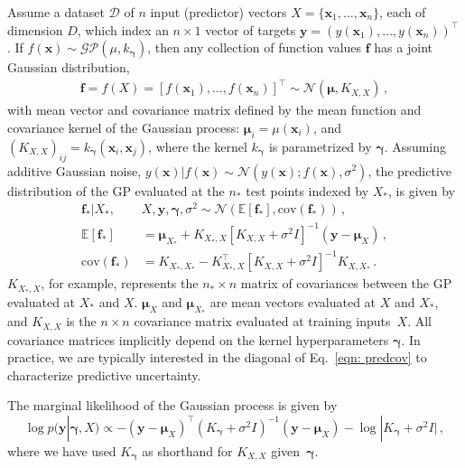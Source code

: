 \documentclass[11pt]{article}
\newcommand{\mbf}[1]{{\boldsymbol{\mathbf{#1}}}}
\renewcommand{\bm}{\mbf}
\begin{document}
Assume a dataset $\mathcal{D}$ of $n$ input (predictor) vectors
$X = \{\bm{x}_1,\dots,\bm{x}_n\}$, each of dimension $D$,
which index an $n \times 1$ vector of targets
$\bm{y} = (y(\bm{x}_1),\dots,y(\bm{x}_n))^{\top}$.  If
$f(\bm{x}) \sim \mathcal{GP}(\mu,k_{\bm{\gamma}})$, then any
collection of function values $\bm{f}$ has a joint Gaussian
distribution,
\begin{align}
 \bm{f} = f(X) = [f(\bm{x}_1),\dots,f(\bm{x}_n)]^{\top} \sim \mathcal{N}(\bm{\mu},K_{X,X}) \,,  \label{eqn: gpdef}
\end{align}
with mean vector and covariance matrix defined by the mean function and covariance kernel of
the Gaussian process: $\bm{\mu}_i = \mu(\bm{x}_i)$, and $(K_{X,X})_{ij} = k_\bm{\gamma}(\bm{x}_i,\bm{x}_j)$,
where the kernel $k_{\bm{\gamma}}$ is parametrized by $\bm{\gamma}$.  Assuming additive
Gaussian noise, $y(\bm{x})|f(\bm{x}) \sim \mathcal{N}(y(\bm{x}); f(\bm{x}),\sigma^2)$,
the predictive distribution of the GP evaluated at the
$n_*$ test points indexed by $X_*$, is given by
\begin{align}
 \bm{f}_*|X_*,&X,\bm{y},\bm{\gamma},\sigma^2 \sim \mathcal{N}(\mathbb{E}[\bm{f}_*],\text{cov}(\bm{f}_*)) \,, \label{eqn: fullpred}  \\
 \mathbb{E}[\bm{f}_*] &= \bm{\mu}_{X_*}  + K_{X_*,X}[K_{X,X}+\sigma^2 I]^{-1} (\bm{y} - \bm{\mu}_X)\,,    \\
 \text{cov}(\bm{f}_*) &= K_{X_*,X_*} - K_{X_*,X}^{\top}[K_{X,X}+\sigma^2 I]^{-1}K_{X,X_*} \,. \label{eqn: predcov}
\end{align}
$K_{X_*,X}$, for example, represents the $n_* \times n$ matrix of covariances between
the GP evaluated at $X_*$ and $X$.   $\bm{\mu}_{X}$  and $\bm{\mu}_{X_*}$ are mean
vectors evaluated at $X$ and $X_*$, and $K_{X,X}$ is the $n \times n$ covariance
matrix evaluated at training inputs~$X$.
All covariance matrices implicitly depend on the kernel hyperparameters $\bm{\gamma}$.  In practice, we are typically interested in the diagonal of Eq.~\eqref{eqn: predcov} to characterize predictive uncertainty.  

The marginal likelihood of the Gaussian process is given by
\begin{equation}
 \log p(\bm{y} | \bm{\gamma}, X) \propto -(\bm{y}-\bm{\mu}_X)^{\top}(K_{\bm{\gamma}}+\sigma^2 I)^{-1}(\bm{y}-\bm{\mu}_X) - \log|K_{\bm{\gamma}} + \sigma^2 I|\,,  \label{eqn: mlikeli}
\end{equation}
where we have used $K_{\bm{\gamma}}$ as shorthand for $K_{X,X}$ given~$\bm{\gamma}$.  
\end{document}
